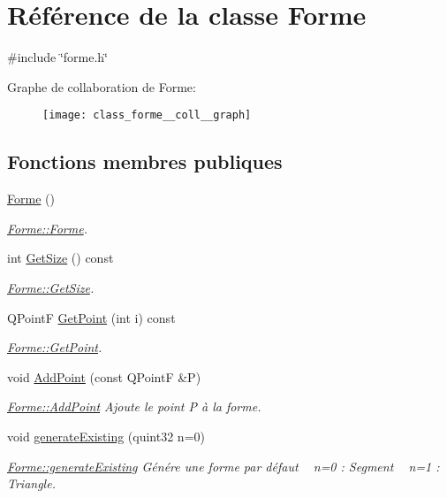 \hypertarget{class_forme}{}\section{Référence de la classe Forme}
\label{class_forme}


{\ttfamily \#include \char`\"{}forme.\+h\char`\"{}}



Graphe de collaboration de Forme\+:\nopagebreak
\begin{figure}[H]
\begin{center}
\leavevmode
\texttt{[image: class\_forme\_\_coll\_\_graph]}
\end{center}
\end{figure}
\subsection*{Fonctions membres publiques}
\begin{DoxyCompactItemize}
\item 
\hyperlink{class_forme_a3c97c1066856b548d2fe6db963a28800}{Forme} ()
\begin{DoxyCompactList}\small\item\em \hyperlink{class_forme_a3c97c1066856b548d2fe6db963a28800}{Forme\+::\+Forme}. \end{DoxyCompactList}\item 
int \hyperlink{class_forme_a18a45c488d85542be6643203164411f7}{Get\+Size} () const 
\begin{DoxyCompactList}\small\item\em \hyperlink{class_forme_a18a45c488d85542be6643203164411f7}{Forme\+::\+Get\+Size}. \end{DoxyCompactList}\item 
Q\+Point\+F \hyperlink{class_forme_a6af2d02eca70f05c8f9104398fd495b2}{Get\+Point} (int i) const 
\begin{DoxyCompactList}\small\item\em \hyperlink{class_forme_a6af2d02eca70f05c8f9104398fd495b2}{Forme\+::\+Get\+Point}. \end{DoxyCompactList}\item 
void \hyperlink{class_forme_a1d74e380c02058ba990a4b00459f2181}{Add\+Point} (const Q\+Point\+F \&P)
\begin{DoxyCompactList}\small\item\em \hyperlink{class_forme_a1d74e380c02058ba990a4b00459f2181}{Forme\+::\+Add\+Point} Ajoute le point P à la forme. \end{DoxyCompactList}\item 
void \hyperlink{class_forme_a82ab6fef4abe9d70d1dcf79824010a8a}{generate\+Existing} (quint32 n=0)
\begin{DoxyCompactList}\small\item\em \hyperlink{class_forme_a82ab6fef4abe9d70d1dcf79824010a8a}{Forme\+::generate\+Existing} Génére une forme par défaut ~\newline
 n=0 \+: Segment ~\newline
 n=1 \+: Triangle. \end{DoxyCompactList}\end{DoxyCompactItemize}
